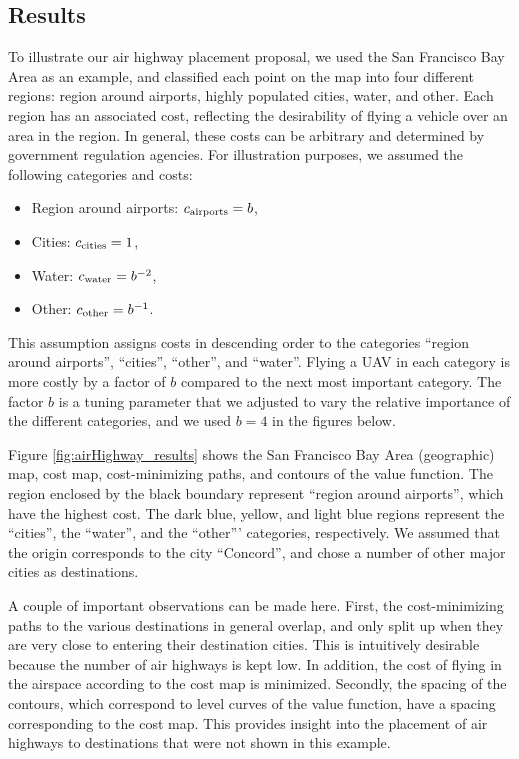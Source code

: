 \subsection{Results}
To illustrate our air highway placement proposal, we used the San Francisco Bay Area as an example, and classified each point on the map into four different regions: region around airports, highly populated cities, water, and other. Each region has an associated cost, reflecting the desirability of flying a vehicle over an area in the region. In general, these costs can be arbitrary and determined by government regulation agencies. For illustration purposes, we assumed the following categories and costs:

\begin{itemize}
\item Region around airports: $c_\text{airports}=b$,
\item Cities: $c_\text{cities}=1$,
\item Water: $c_\text{water}=b^{-2}$,
\item Other: $c_\text{other}=b^{-1}$.
\end{itemize}

This assumption assigns costs in descending order to the categories ``region around airports'', ``cities'', ``other'', and ``water''. Flying a UAV in each category is more costly by a factor of $b$ compared to the next most important category. The factor $b$ is a tuning parameter that we adjusted to vary the relative importance of the different categories, and we used $b=4$ in the figures below.

Figure \ref{fig:airHighway_results} shows the San Francisco Bay Area (geographic) map, cost map, cost-minimizing paths, and contours of the value function. The region enclosed by the black boundary represent ``region around airports'', which have the highest cost. The dark blue, yellow, and light blue regions represent the ``cities'', the ``water'', and the ``other''' categories, respectively. We assumed that the origin corresponds to the city ``Concord'', and chose a number of other major cities as destinations.

A couple of important observations can be made here. First, the cost-minimizing paths to the various destinations in general overlap, and only split up when they are very close to entering their destination cities. This is intuitively desirable because the number of air highways is kept low. In addition, the cost of flying in the airspace according to the cost map is minimized. Secondly, the spacing of the contours, which correspond to level curves of the value function, have a spacing corresponding to the cost map. This provides insight into the placement of air highways to destinations that were not shown in this example.

